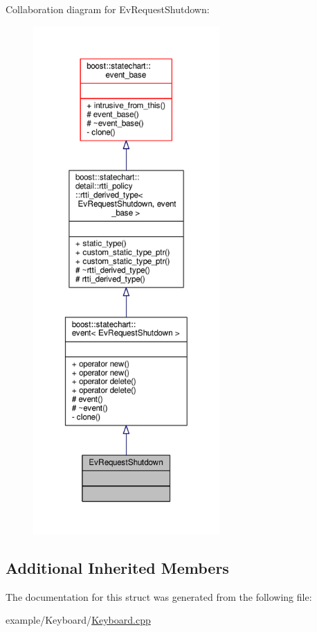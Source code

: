 Collaboration diagram for Ev\+Request\+Shutdown\+:
\nopagebreak
\begin{figure}[H]
\begin{center}
\leavevmode
\includegraphics[height=550pt]{struct_ev_request_shutdown__coll__graph}
\end{center}
\end{figure}
\subsection*{Additional Inherited Members}


The documentation for this struct was generated from the following file\+:\begin{DoxyCompactItemize}
\item 
example/\+Keyboard/\mbox{\hyperlink{_keyboard_8cpp}{Keyboard.\+cpp}}\end{DoxyCompactItemize}

